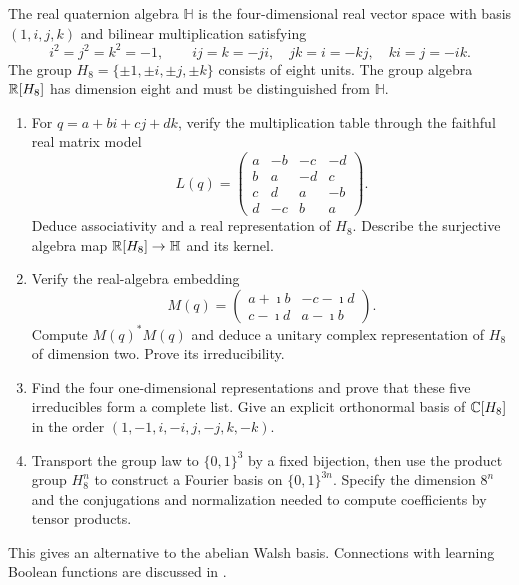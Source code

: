 
\begin{exo}
\label{exo-grpe-quaternionique}
The real quaternion algebra $\mathbb H$ is the four-dimensional real
vector space with basis $(1,i,j,k)$ and bilinear multiplication satisfying
\[
 i^2=j^2=k^2=-1,\qquad ij=k=-ji,\quad jk=i=-kj,\quad ki=j=-ik.
\]
The group $H_8=\{\pm1,\pm i,\pm j,\pm k\}$ consists of eight units.
The group algebra $\mathbb{R}[H_8]$ has dimension eight and must be distinguished
from $\mathbb H$.
\begin{enumerate}
\item For $q=a+bi+cj+dk$, verify the multiplication table through the
faithful real matrix model
\[
 L(q)=\begin{pmatrix}
 a&-b&-c&-d\\b&a&-d&c\\c&d&a&-b\\d&-c&b&a
 \end{pmatrix}.
\]
Deduce associativity and a real representation of $H_8$. Describe the
surjective algebra map $\mathbb{R}[H_8]\to\mathbb H$ and its kernel.
\item Verify the real-algebra embedding
\[
 M(q)=\begin{pmatrix}a+\imath b&-c-\imath d\\c-\imath d&a-\imath b\end{pmatrix}.
\]
Compute $M(q)^*M(q)$ and deduce a unitary complex representation of
$H_8$ of dimension two. Prove its irreducibility.
\item Find the four one-dimensional representations and prove that
these five irreducibles form a complete list. Give an explicit orthonormal
basis of $\mathbb{C}[H_8]$ in the order $(1,-1,i,-i,j,-j,k,-k)$.
\item Transport the group law to $\{0,1\}^3$ by a fixed bijection,
then use the product group $H_8^n$ to construct a Fourier basis on
$\{0,1\}^{3n}$. Specify the dimension $8^n$ and the conjugations and
normalization needed to compute coefficients by tensor products.
\end{enumerate}
This gives an alternative to the abelian Walsh basis. Connections with
learning Boolean functions are discussed in \cite{boneh-learning-boolean}.
\end{exo}


